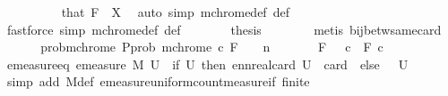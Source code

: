 \begin{isabellebody}
\ \ \ \ \ \ \ \ \isamarkupfalse%
\ that\ {\isacartoucheopen}F\ {\isasymsubseteq}\ X{\isacartoucheclose}\ \isamarkupfalse%
\ {\isacharparenleft}{\kern0pt}auto\ simp{\isacharcolon}{\kern0pt}\ mchrome{\isacharunderscore}{\kern0pt}def\ {\isasymOmega}{\isacharunderscore}{\kern0pt}def{\isacharparenright}{\kern0pt}\isanewline
\ \ \ \ \isamarkupfalse%
\ {\isacharparenleft}{\kern0pt}fastforce\ simp{\isacharcolon}{\kern0pt}\ mchrome{\isacharunderscore}{\kern0pt}def\ {\isasymOmega}{\isacharunderscore}{\kern0pt}def{\isacharparenright}{\kern0pt}{\isacharplus}{\kern0pt}\isanewline
\ \ \ \ \isamarkupfalse%
\ \isamarkupfalse%
\ {\isacharquery}{\kern0pt}thesis\isanewline
\ \ \ \ \ \ \isamarkupfalse%
\ {\isacharparenleft}{\kern0pt}metis\ bij{\isacharunderscore}{\kern0pt}betw{\isacharunderscore}{\kern0pt}same{\isacharunderscore}{\kern0pt}card{\isacharparenright}{\kern0pt}\isanewline
\ \ \isamarkupfalse%
\isanewline
\ \ \isamarkupfalse%
\ prob{\isacharunderscore}{\kern0pt}mchrome{\isacharcolon}{\kern0pt}\ {\isachardoublequoteopen}P{\isachardot}{\kern0pt}prob\ {\isacharparenleft}{\kern0pt}mchrome\ c\ F{\isacharparenright}{\kern0pt}\ {\isacharequal}{\kern0pt}\ {}\ {\isacharslash}{\kern0pt}\ {}{\isacharcircum}{\kern0pt}n{\isachardoublequoteclose}\ \ \isanewline
\ \ \ \ \ {\isachardoublequoteopen}F\ {\isasymin}\ {\isasymF}{\isachardoublequoteclose}\ {\isachardoublequoteopen}c{\isacharless}{\kern0pt}{}{\isachardoublequoteclose}\ \ F\ c\isanewline
\ \ \isamarkupfalse%
\ {\isacharminus}{\kern0pt}\isanewline
\ \ \ \ \isamarkupfalse%
\ emeasure{\isacharunderscore}{\kern0pt}eq{\isacharcolon}{\kern0pt}\ {\isachardoublequoteopen}emeasure\ M\ U\ {\isacharequal}{\kern0pt}\ {\isacharparenleft}{\kern0pt}if\ U{\isasymsubseteq}{\isasymOmega}\ then\ ennreal{\isacharparenleft}{\kern0pt}card\ U\ {\isacharslash}{\kern0pt}\ card\ {\isasymOmega}{\isacharparenright}{\kern0pt}\ else\ {}{\isacharparenright}{\kern0pt}{\isachardoublequoteclose}\ \ U\isanewline
\ \ \ \ \ \ \isamarkupfalse%
\ {\isacharparenleft}{\kern0pt}simp\ add{\isacharcolon}{\kern0pt}\ M{\isacharunderscore}{\kern0pt}def\ emeasure{\isacharunderscore}{\kern0pt}uniform{\isacharunderscore}{\kern0pt}count{\isacharunderscore}{\kern0pt}measure{\isacharunderscore}{\kern0pt}if\ {\isacartoucheopen}finite\ {\isasymOmega}{\isacartoucheclose}{\isacharparenright}{\kern0pt}\isanewline

\end{isabellebody}
